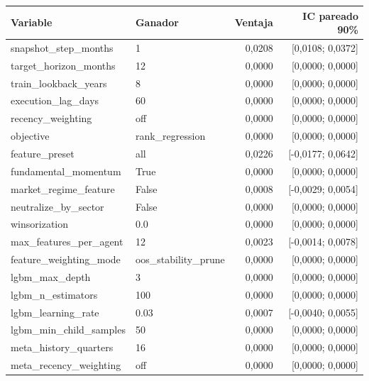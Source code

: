 \begin{tabular}{llrr}
\toprule
Variable & Ganador & Ventaja & IC pareado 90\% \\
\midrule
snapshot\_step\_months & 1 & 0,0208 & [0,0108; 0,0372] \\
target\_horizon\_months & 12 & 0,0000 & [0,0000; 0,0000] \\
train\_lookback\_years & 8 & 0,0000 & [0,0000; 0,0000] \\
execution\_lag\_days & 60 & 0,0000 & [0,0000; 0,0000] \\
recency\_weighting & off & 0,0000 & [0,0000; 0,0000] \\
objective & rank\_regression & 0,0000 & [0,0000; 0,0000] \\
feature\_preset & all & 0,0226 & [-0,0177; 0,0642] \\
fundamental\_momentum & True & 0,0000 & [0,0000; 0,0000] \\
market\_regime\_feature & False & 0,0008 & [-0,0029; 0,0054] \\
neutralize\_by\_sector & False & 0,0000 & [0,0000; 0,0000] \\
winsorization & 0.0 & 0,0000 & [0,0000; 0,0000] \\
max\_features\_per\_agent & 12 & 0,0023 & [-0,0014; 0,0078] \\
feature\_weighting\_mode & oos\_stability\_prune & 0,0000 & [0,0000; 0,0000] \\
lgbm\_max\_depth & 3 & 0,0000 & [0,0000; 0,0000] \\
lgbm\_n\_estimators & 100 & 0,0000 & [0,0000; 0,0000] \\
lgbm\_learning\_rate & 0.03 & 0,0007 & [-0,0040; 0,0055] \\
lgbm\_min\_child\_samples & 50 & 0,0000 & [0,0000; 0,0000] \\
meta\_history\_quarters & 16 & 0,0000 & [0,0000; 0,0000] \\
meta\_recency\_weighting & off & 0,0000 & [0,0000; 0,0000] \\
\bottomrule
\end{tabular}
